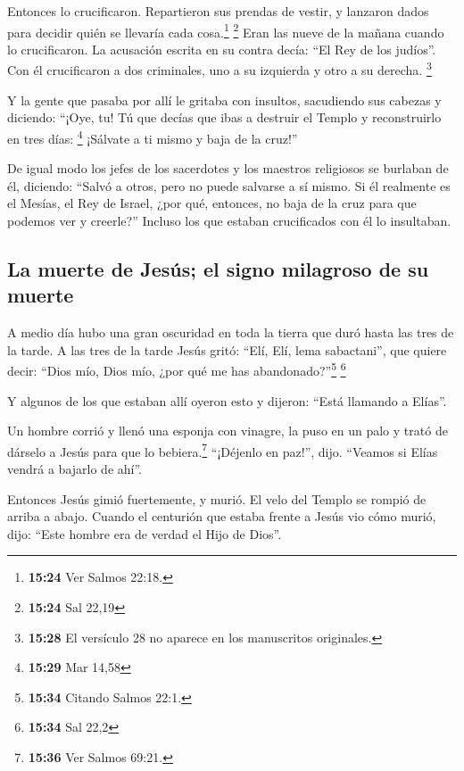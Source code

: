  Entonces lo crucificaron. Repartieron sus prendas de
vestir, y lanzaron dados para decidir quién se llevaría cada
cosa.\footnote{\textbf{15:24} Ver Salmos 22:18.} \footnote{\textbf{15:24}
  Sal 22,19}  Eran las nueve de la mañana cuando lo
crucificaron.  La acusación escrita en su contra decía:
``El Rey de los judíos''.  Con él crucificaron a dos
criminales, uno a su izquierda y otro a su derecha. 
\footnote{\textbf{15:28} El versículo 28 no aparece en los manuscritos
  originales.}

 Y la gente que pasaba por allí le gritaba con insultos,
sacudiendo sus cabezas y diciendo: ``¡Oye, tu! Tú que decías que ibas a
destruir el Templo y reconstruirlo en tres días: \footnote{\textbf{15:29}
  Mar 14,58}  ¡Sálvate a ti mismo y baja de la cruz!''

 De igual modo los jefes de los sacerdotes y los maestros
religiosos se burlaban de él, diciendo: ``Salvó a otros, pero no puede
salvarse a sí mismo.  Si él realmente es el Mesías, el
Rey de Israel, ¿por qué, entonces, no baja de la cruz para que podemos
ver y creerle?'' Incluso los que estaban crucificados con él lo
insultaban.

\hypertarget{la-muerte-de-jesuxfas-el-signo-milagroso-de-su-muerte}{%
\subsection{La muerte de Jesús; el signo milagroso de su
muerte}\label{la-muerte-de-jesuxfas-el-signo-milagroso-de-su-muerte}}

 A medio día hubo una gran oscuridad en toda la tierra
que duró hasta las tres de la tarde.  A las tres de la
tarde Jesús gritó: ``Elí, Elí, lema sabactani'', que quiere decir:
``Dios mío, Dios mío, ¿por qué me has abandonado?''\footnote{\textbf{15:34}
  Citando Salmos 22:1.} \footnote{\textbf{15:34} Sal 22,2}

 Y algunos de los que estaban allí oyeron esto y dijeron:
``Está llamando a Elías''.

 Un hombre corrió y llenó una esponja con vinagre, la
puso en un palo y trató de dárselo a Jesús para que lo
bebiera.\footnote{\textbf{15:36} Ver Salmos 69:21.} ``¡Déjenlo en
paz!'', dijo. ``Veamos si Elías vendrá a bajarlo de ahí''.

 Entonces Jesús gimió fuertemente, y murió.
 El velo del Templo se rompió de arriba a abajo.
 Cuando el centurión que estaba frente a Jesús vio cómo
murió, dijo: ``Este hombre era de verdad el Hijo de Dios''.

